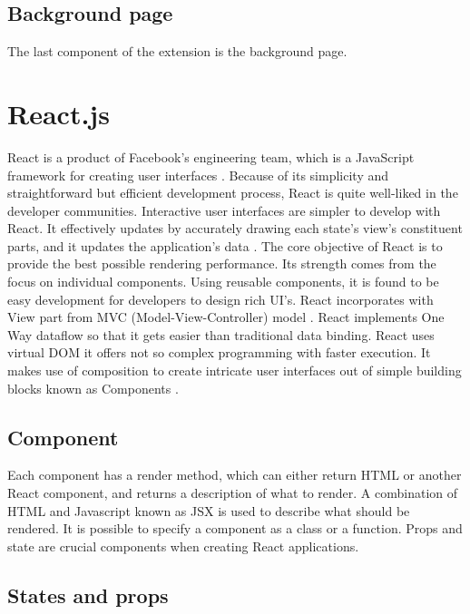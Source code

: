 \subsection{Background page}

The last component of the extension is the background page.


\section{React.js}

React is a product of Facebook's engineering team, which is a JavaScript framework for creating user interfaces \autocite{gackenheimer2015introducing}. Because of its simplicity and straightforward but efficient development process, React is quite well-liked in the developer communities. Interactive user interfaces are simpler to develop with React. It effectively updates by accurately drawing each state's view's constituent parts, and it updates the application's data \autocite{islam2017reactjs}. The core objective of React is to provide the best possible rendering performance. Its strength comes from the focus on individual components. Using reusable components, it is found to be easy development for developers to design rich UI's. React incorporates with View part from MVC (Model-View-Controller) model \autocite{maratkar2021re}. React implements One Way dataflow so that it gets easier than traditional data binding. React uses virtual DOM it offers not so complex programming with faster execution. It makes use of composition to create intricate user interfaces out of simple building blocks known as Components \autocite{david2020building}.

\subsection{Component}

Each component has a render method, which can either return HTML or another React component, and returns a description of what to render. A combination of HTML and Javascript known as JSX is used to describe what should be rendered. It is possible to specify a component as a class or a function. Props and state are crucial components when creating React applications.

\subsection{States and props}

